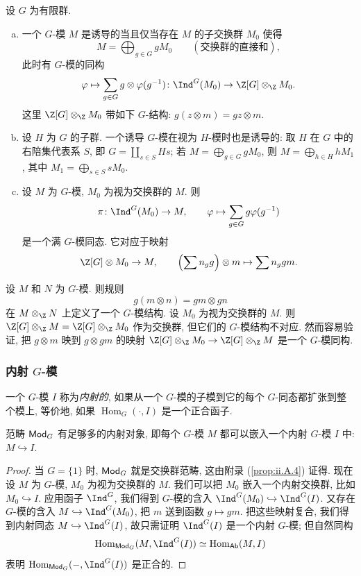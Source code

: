 \begin{remark}\label{rem:ii.1.3}
设 $G$ 为有限群.
\begin{enumerate}[(a)]
\item 一个 $G$-模 $M$ 是诱导的当且仅当存在 $M$ 的子交换群 $M_0$ 使得
\[
 M=\bigoplus_{g\in G} g M_0\qquad(\text{交换群的直接和}),
\]
此时有 $G$-模的同构
\[
 \varphi\mapsto \sum_{g\in G} g\otimes \varphi(g^{-1})\colon \Ind^G(M_0)\to \Z[G]\otimes_\Z M_0.
\]
这里 $\Z[G]\otimes_\Z M_0$ 带如下 $G$-结构: $g(z\otimes m)=gz\otimes m$.
\item 设 $H$ 为 $G$ 的子群. 一个诱导 $G$-模在视为 $H$-模时也是诱导的: 取 $H$ 在 $G$ 中的右陪集代表系 $S$, 即 $G=\coprod_{s\in S}Hs$; 若 $M=\bigoplus_{g\in G}gM_0$, 则 $M=\bigoplus_{h\in H}hM_1$, 其中 $M_1=\bigoplus_{s\in S}sM_0$.
\item 设 $M$ 为 $G$-模, $M_0$ 为视为交换群的 $M$. 则
\[
 \pi\colon \Ind^G(M_0)\to M,\qquad \varphi\mapsto \sum_{g\in G} g\varphi(g^{-1})
\]
是一个满 $G$-模同态. 它对应于映射
\[
 \Z[G]\otimes M_0\to M,\qquad \Bigl(\sum n_g g\Bigr)\otimes m\mapsto \sum n_g g m.
\]
\end{enumerate}
\end{remark}

\begin{remark}\label{rem:ii.1.4}
设 $M$ 和 $N$ 为 $G$-模. 则规则
\[
 g(m\otimes n)=gm\otimes gn
\]
在 $M\otimes_\Z N$ 上定义了一个 $G$-模结构. 设 $M_0$ 为视为交换群的 $M$. 则 $\Z[G]\otimes_\Z M=\Z[G]\otimes_\Z M_0$ 作为交换群, 但它们的 $G$-模结构不对应. 然而容易验证, 把 $g\otimes m$ 映到 $g\otimes gm$ 的映射 $\Z[G]\otimes_\Z M_0\to \Z[G]\otimes_\Z M$ 是一个 $G$-模同构.
\end{remark}

\subsubsection*{内射 $G$-模}

一个 $G$-模 $I$ 称为\emph{内射的}, 如果从一个 $G$-模的子模到它的每个 $G$-同态都扩张到整个模上, 等价地, 如果 $\operatorname{Hom}_G(\cdot,I)$ 是一个正合函子.

\begin{proposition}\label{prop:ii.1.5}
范畴 $\mathsf{Mod}_G$ 有足够多的内射对象, 即每个 $G$-模 $M$ 都可以嵌入一个内射 $G$-模 $I$ 中: $M\hookrightarrow I$.
\end{proposition}

\begin{proof}
当 $G=\{1\}$ 时, $\mathsf{Mod}_G$ 就是交换群范畴, 这由附录 (\ref{prop:ii.A.4}) 证得. 现在设 $M$ 为 $G$-模, $M_0$ 为视为交换群的 $M$. 我们可以把 $M_0$ 嵌入一个内射交换群, 比如 $M_0\hookrightarrow I$. 应用函子 $\Ind^G$, 我们得到 $G$-模的含入 $\Ind^G(M_0)\hookrightarrow \Ind^G(I)$. 又存在 $G$-模的含入 $M\hookrightarrow \Ind^G(M_0)$, 把 $m$ 送到函数 $g\mapsto g m$. 把这些映射复合, 我们得到内射同态 $M\hookrightarrow \Ind^G(I)$, 故只需证明 $\Ind^G(I)$ 是一个内射 $G$-模; 但自然同构
\[
 \operatorname{Hom}_{\Mod_G}(M,\Ind^G(I))\simeq \operatorname{Hom}_{\Ab}(M,I)
\]
表明 $\operatorname{Hom}_{\Mod_G}(-,\Ind^G(I))$ 是正合的.
\end{proof}

